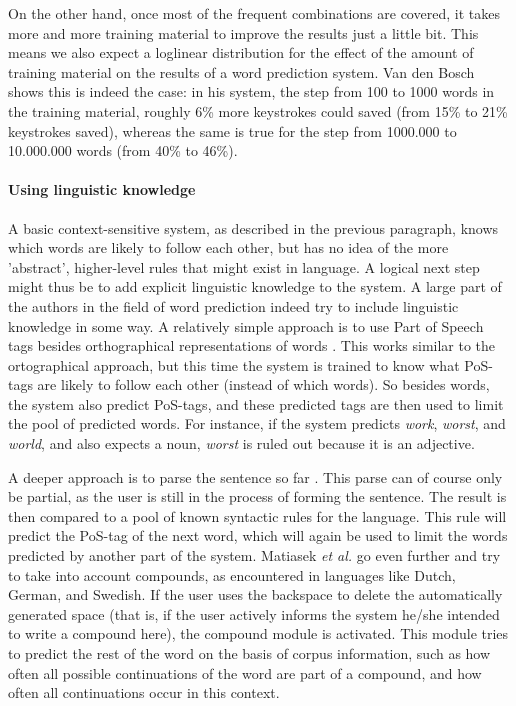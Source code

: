 \documentclass[11pt]{article}
\begin{document}
On the other hand, once most of the frequent combinations are covered, it takes more and more training material to improve the results just a little bit. This means we also expect a loglinear distribution for the effect of the amount of training material on the results of a word prediction system. Van den Bosch  shows this is indeed the case: in his system, the step from 100 to 1000 words in the training material, roughly 6\% more keystrokes could saved (from 15\% to 21\% keystrokes saved), whereas the same is true for the step from 1000.000 to 10.000.000 words (from 40\% to 46\%).

\paragraph{Using linguistic knowledge}

A basic context-sensitive system, as described in the previous paragraph, knows which words are likely to follow each other, but has no idea of the more 'abstract', higher-level rules that might exist in language. A logical next step might thus be to add explicit linguistic knowledge to the system. A large part of the authors in the field of word prediction indeed try to include linguistic knowledge in some way. A relatively simple approach is to use Part of Speech tags besides orthographical representations of words \cite{carlberger+97,Fazly+03,copestake97}. This works similar to the ortographical approach, but this time the system is trained to know what PoS-tags are likely to follow each other (instead of which words). So besides words, the system also predict PoS-tags, and these predicted tags are then used to limit the pool of predicted words. For instance, if the system predicts \emph{work}, \emph{worst}, and \emph{world}, and also expects a noun, \emph{worst} is ruled out because it is an adjective.

A deeper approach is to parse the sentence so far \cite{Matiasek+02,garay-vitoria+97}. This parse can of course only be partial, as the user is still in the process of forming the sentence. The result is then compared to a pool of known syntactic rules for the language. This rule will predict the PoS-tag of the next word, which will again be used to limit the words predicted by another part of the system. Matiasek {\em et al.}  go even further and try to take into account compounds, as encountered in languages like Dutch, German, and Swedish. If the user uses the backspace to delete the automatically generated space (that is, if the user actively informs the system he/she intended to write a compound here), the compound module is activated. This module tries to predict the rest of the word on the basis of corpus information, such as how often all possible continuations of the word are part of a compound, and how often all continuations occur in this context.
\end{document}
